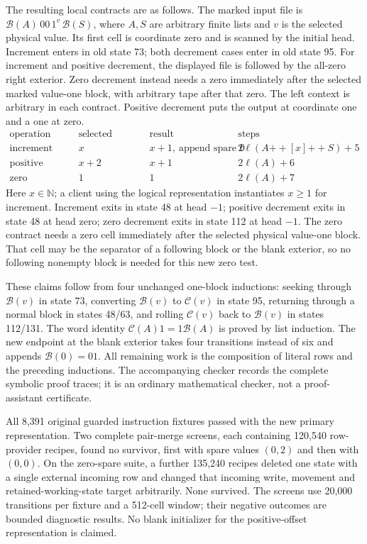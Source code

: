 The resulting local contracts are as follows.  The marked input file is
$\mathcal B(A)\,00\,1^v\,\mathcal B(S)$, where $A,S$ are arbitrary
finite lists and $v$ is the selected physical value.  Its first cell is
coordinate zero and is scanned by the initial head.  Increment enters in
old state 73; both decrement cases enter in old state 95.
For increment and positive decrement, the displayed file is followed by
the all-zero right exterior.  Zero decrement instead needs a zero immediately
after the selected marked value-one block, with arbitrary tape after that zero.
The left context is arbitrary in each contract.  Positive decrement puts the output at coordinate one and a one at zero.
\[
\begin{array}{c|c|c|c}
\text{operation}&\text{selected physical value}&\text{result}&\text{steps}\\\hline
\text{increment}&x&x+1,\ \text{append spare }0&2\ell(A\mathbin{+\!+}[x]\mathbin{+\!+}S)+5\\
\text{positive decrement}&x+2&x+1&2\ell(A)+6\\
\text{zero decrement}&1&1&2\ell(A)+7
\end{array}
\]
Here $x\in\mathbb N$; a client using the logical representation instantiates
$x\ge1$ for increment.  Increment exits in state 48 at head $-1$; positive
decrement exits in state 48 at head zero; zero decrement exits in state 112
at head $-1$.  The zero contract needs a zero cell immediately after the
selected physical value-one block.  That cell may be the separator of a
following block or the blank exterior, so no following nonempty block is
needed for this new zero test.

These claims follow from four unchanged one-block inductions: seeking through
$\mathcal B(v)$ in state 73, converting $\mathcal B(v)$ to $\mathcal C(v)$ in
state 95, returning through a normal block in states 48/63, and rolling
$\mathcal C(v)$ back to $\mathcal B(v)$ in states 112/131.  The word identity
$\mathcal C(A)1=1\mathcal B(A)$ is proved by list induction.  The new endpoint
at the blank exterior takes four transitions instead of six and appends
$\mathcal B(0)=01$.  All remaining work is the composition of literal rows
and the preceding inductions.  The accompanying checker records the complete
symbolic proof traces; it is an ordinary mathematical checker, not a
proof-assistant certificate.

All 8,391 original guarded instruction fixtures passed with the new primary
representation.  Two complete pair-merge screens, each containing 120,540
row-provider recipes, found no survivor, first with spare values $(0,2)$ and
then with $(0,0)$.  On the zero-spare suite, a further 135,240 recipes deleted
one state with a single external incoming row and changed that incoming
write, movement and retained-working-state target arbitrarily.  None survived.  The screens use 20,000 transitions per
fixture and a 512-cell window; their negative outcomes are bounded diagnostic
results.  No blank initializer for the positive-offset representation is
claimed.

